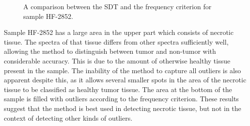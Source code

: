 \begin{figure}[H]
    \centering
    \qquad
    \caption{A comparison between the SDT and the frequency criterion for sample HF-2852.
\label{fig:stdHF2852}}%
\end{figure}


Sample HF-2852 has a large area in the upper part which consists of necrotic tissue. The spectra of that tissue differs from other spectra sufficiently well, allowing the method to distinguish between tumor and non-tumor with considerable accuracy. This is due to the amount of otherwise healthy tissue present in the sample. The inability of the method to capture all outliers is also apparent despite this, as it allows several smaller spots in the area of the necrotic tissue to be classified as healthy tumor tissue. The area at the bottom of the sample is filled with outliers according to the frequency criterion. These results suggest that the method is best used in detecting necrotic tissue, but not in the context of detecting other kinds of outliers.

